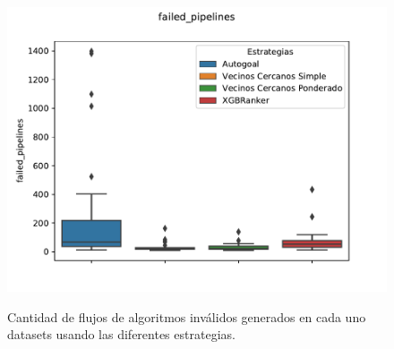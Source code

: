 \begin{figure}[H]
\centering
\includegraphics[scale=.75]{Figures/failed pipelines.pdf}
\label{fig:failedpipelines}
\caption{Cantidad de flujos de algoritmos inválidos generados en cada uno datasets usando las diferentes estrategias.}
\end{figure}

%

